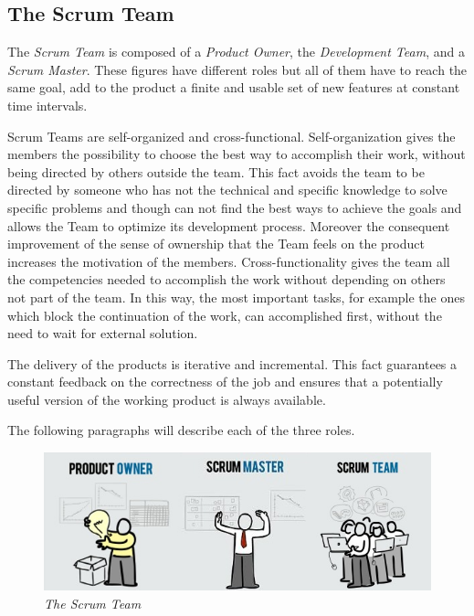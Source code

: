 \newpage

		\subsection{The Scrum Team}\label{ref_scrum_team}
		The \emph{Scrum Team} is composed of a \emph{Product Owner}, the \emph{Development Team}, and a \emph{Scrum Master}.
		These figures have different roles but all of them have to reach the same goal, add to the product a finite and usable set of new features at constant time intervals. %

		Scrum Teams are self-organized and cross-functional. Self-organization gives the members the possibility to choose the best way to accomplish their work, without being directed by others outside the team. This fact avoids the team to be directed by someone who has not the technical and specific knowledge to solve specific problems and though can not find the best ways to achieve the goals and allows the Team to optimize its development process. Moreover the consequent improvement of the sense of ownership that the Team feels on the product increases the motivation of the members. Cross-functionality gives the team all the competencies needed to accomplish the work without depending on others not part of the team. In this way, the most important tasks, for example the ones which block the continuation of the work, can accomplished first, without the need to wait for external solution. 


		The delivery of the products is iterative and incremental. This fact guarantees a constant feedback on the correctness of the job and ensures that a potentially useful version of the working product is always available.

		The following paragraphs will describe each of the three roles.

		\begin{figure}[h]
		  \begin{center} 
		    \includegraphics[scale=0.75]{images/ch_04/scrum_team_final.jpg}
		  \end{center} 
		  \caption{\textit{The Scrum Team}}  
		  \label{fig:ScrumTeam}
	  	\end{figure}
			

